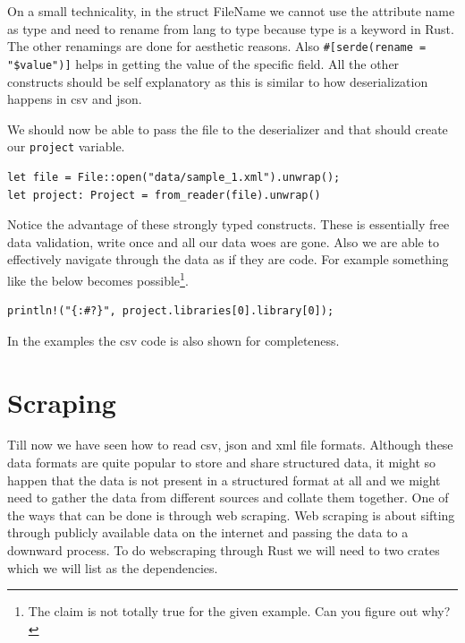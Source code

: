 \documentclass{book}
\begin{document}
On a small technicality, in the struct FileName we cannot use the attribute name as type and need to rename from lang to type because type is a keyword in Rust. The other renamings are done for aesthetic reasons. Also \lstinline{#[serde(rename = "$value")]} helps in getting the value of the specific field. All the other constructs should be self explanatory as this is similar to how deserialization happens in csv and json.

We should now be able to pass the file to the deserializer and that should create our \lstinline{project} variable.

\begin{lstlisting}[caption={chapter4\\/working\_with\_data\\/data\_formats\\/src\\/xmlreading\\.rs},basicstyle=\small]
let file = File::open("data/sample_1.xml").unwrap();
let project: Project = from_reader(file).unwrap()
\end{lstlisting}

Notice the advantage of these strongly typed constructs. These is essentially free data validation, write once and all our data woes are gone. Also we are able to effectively navigate through the data as if they are code. For example something like the below becomes possible\footnote{The claim is not totally true for the given example. Can you figure out why?}.

\begin{lstlisting}
println!("{:#?}", project.libraries[0].library[0]);
\end{lstlisting}

In the examples the csv code is also shown for completeness.

\label{sec:xml}

\section{Scraping}%
Till now we have seen how to read csv, json and xml file formats. Although these data formats are quite popular to store and share structured data, it might so happen that the data is not present in a structured format at all and we might need to gather the data from different sources and collate them together. One of the ways that can be done is through web scraping. Web scraping is about sifting through publicly available data on the internet and passing the data to a downward process. To do webscraping through Rust we will need to two crates which we will list as the dependencies.
\end{document}
